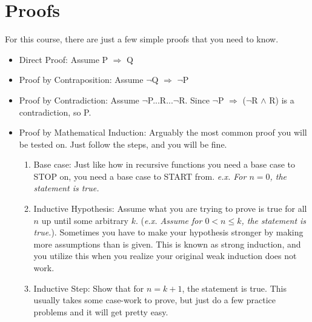 \documentclass[a4paper]{article}
\begin{document}
\section{Proofs}
For this course, there are just a few simple proofs that you need to know.

\begin{itemize}
  \item Direct Proof: Assume P $\Rightarrow$ Q
  \item Proof by Contraposition: Assume $\neg$Q $\Rightarrow$ $\neg$P
  \item Proof by Contradiction: Assume $\neg$P...R...$\neg$R. Since $\neg$P $\Rightarrow$ ($\neg$R $\land$ R) is a contradiction, so P.
  \item Proof by Mathematical Induction: Arguably the most common proof you will be tested on. Just follow the steps, and you will be fine. \\

  \begin{enumerate}
  	\item Base case: Just like how in recursive functions you need a base case to STOP on, you need a base case to START from. \textit{e.x. For $n = 0$, the statement is true. \checkmark}
  	\item Inductive Hypothesis: Assume what you are trying to prove is true for all $n$ up until some arbitrary $k$. (\textit{e.x. Assume for $0 < n \leq k$, the statement is true.}). Sometimes you have to make your hypothesis stronger by making more assumptions than is given. This is known as strong induction, and you utilize this when you realize your original weak induction does not work.
  	\item Inductive Step: Show that for $n = k + 1$, the statement is true. This usually takes some case-work to prove, but just do a few practice problems and it will get pretty easy. 
  \end{enumerate}

\end{itemize}
\end{document}
